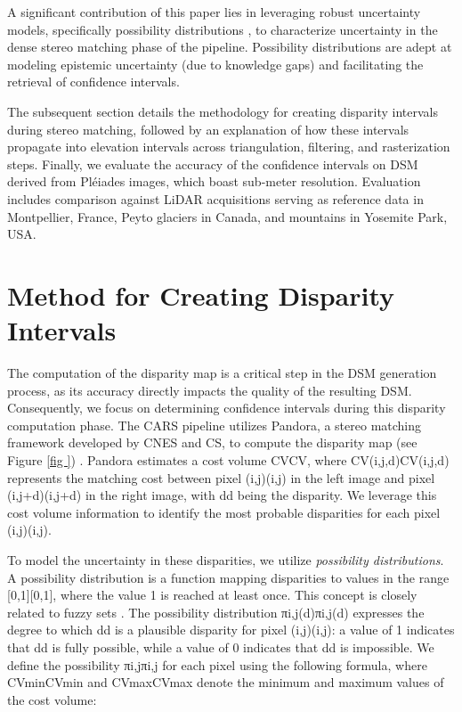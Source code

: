 A significant contribution of this paper lies in leveraging robust uncertainty models, specifically possibility distributions \cite{dubois_when_1992}, to characterize uncertainty in the dense stereo matching phase of the pipeline. Possibility distributions are adept at modeling epistemic uncertainty (due to knowledge gaps) and facilitating the retrieval of confidence intervals.

The subsequent section details the methodology for creating disparity intervals during stereo matching, followed by an explanation of how these intervals propagate into elevation intervals across triangulation, filtering, and rasterization steps. Finally, we evaluate the accuracy of the confidence intervals on DSM derived from Pléiades images, which boast sub-meter resolution. Evaluation includes comparison against LiDAR acquisitions serving as reference data in Montpellier, France, Peyto glaciers in Canada, and mountains in Yosemite Park, USA.

\section{Method for Creating Disparity Intervals}\label{sec
}

The computation of the disparity map is a critical step in the DSM generation process, as its accuracy directly impacts the quality of the resulting DSM. Consequently, we focus on determining confidence intervals during this disparity computation phase. The CARS pipeline utilizes Pandora, a stereo matching framework developed by CNES and CS, to compute the disparity map (see Figure \ref{fig
}) \cite{cournet_ground_2020}. Pandora estimates a cost volume CVCV​, where CV(i,j,d)CV​(i,j,d) represents the matching cost between pixel (i,j)(i,j) in the left image and pixel (i,j+d)(i,j+d) in the right image, with dd being the disparity. We leverage this cost volume information to identify the most probable disparities for each pixel (i,j)(i,j).

To model the uncertainty in these disparities, we utilize \textit{possibility distributions}. A possibility distribution is a function mapping disparities to values in the range [0,1][0,1], where the value 1 is reached at least once. This concept is closely related to fuzzy sets \cite{dubois_when_1992}. The possibility distribution πi,j(d)πi,j​(d) expresses the degree to which dd is a plausible disparity for pixel (i,j)(i,j): a value of 1 indicates that dd is fully possible, while a value of 0 indicates that dd is impossible. We define the possibility πi,jπi,j​ for each pixel using the following formula, where CVmin⁡CVmin​ and CVmax⁡CVmax​ denote the minimum and maximum values of the cost volume:

